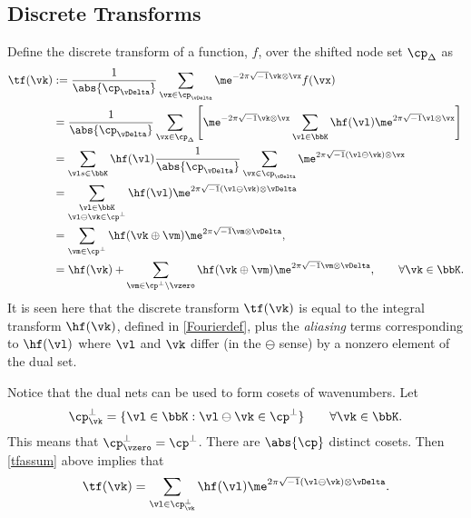 \documentclass[]{elsarticle}
\begin{document}
\subsection{Discrete Transforms}
Define the discrete transform of a function, $f$, over the shifted node set $\cp_{\Delta}$ as 
\begin{align}
\label{tfdef}
\tf(\vk) 
&:= \frac{1}{\abs{\cp_{\vDelta}}} \sum_{\vx \in \cp_{\vDelta}} \me^{-2 \pi \sqrt{-1} \vk \otimes \vx} f(\vx) \\
\nonumber
&= \frac{1}{\abs{\cp_{\vDelta}}} \sum_{\vx \in \cp_{\Delta}} \left[\me^{-2 \pi \sqrt{-1} \vk \otimes \vx}\sum_{\vl \in \bbK} \hf(\vl) \me^{2 \pi \sqrt{-1} \vl \otimes \vx} \right] \\
\nonumber
& = \sum_{\vl  s\in \bbK} \hf(\vl)  \frac{1}{\abs{\cp_{\vDelta}}} \sum_{\vx \in \cp_{\vDelta}}  \me^{2 \pi \sqrt{-1} (\vl \ominus \vk) \otimes \vx} \\
\nonumber
& = \sum_{\substack{\vl \in \bbK \\ \vl \ominus \vk \in \cp^{\perp}}} \hf(\vl) \me^{2 \pi \sqrt{-1} (\vl \ominus \vk) \otimes \vDelta} \\
\nonumber
&= \sum_{\vm \in \cp^{\perp}} \hf(\vk\oplus\vm) \me^{2 \pi \sqrt{-1} \vm \otimes \vDelta}, \\
&= \hf(\vk) + \sum_{\vm \in \cp^{\perp}\setminus \vzero} \hf(\vk\oplus\vm) \me^{2 \pi \sqrt{-1} \vm \otimes \vDelta}, \qquad \forall \vk \in \bbK. \label{tfassum}
\end{align}
It is seen here that the discrete transform $\tf(\vk)$ is equal to the integral transform $\hf(\vk)$, defined in \eqref{Fourierdef}, plus the \emph{aliasing} terms corresponding to $\hf(\vl)$ where $\vl$ and $\vk$ differ (in the $\ominus$ sense) by a nonzero element of the dual set.

Notice that the dual nets can be used to form cosets of wavenumbers.  Let 
\begin{equation*}
\cp^{\perp}_{\vk} = \{ \vl \in \bbK : \vl \ominus \vk \in \cp^{\perp}\} \qquad \forall \vk \in \bbK.
\end{equation*}
This means that $\cp^{\perp}_{\vzero}=\cp^{\perp}$.  There are $\abs{\cp}$ distinct cosets.  Then \eqref{tfassum} above implies that 
\begin{equation}
\label{tfassumb}
\tf(\vk) = \sum_{\vl \in \cp^{\perp}_{\vk}} \hf(\vl) \me^{2 \pi \sqrt{-1} (\vl \ominus \vk) \otimes \vDelta}.
\end{equation}
\end{document}
